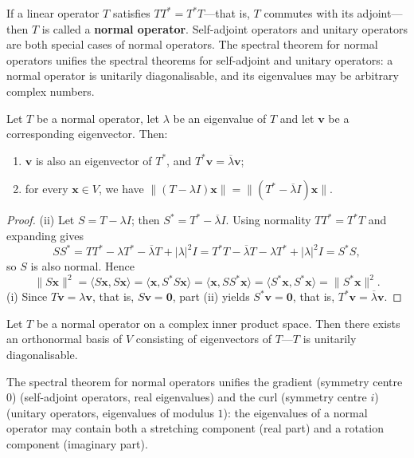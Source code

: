 \begin{definition}\label{def:normal_operator}
If a linear operator $T$ satisfies $T T^* = T^* T$---that is, $T$ commutes with its adjoint---then $T$ is called a \textbf{normal operator}. Self-adjoint operators and unitary operators are both special cases of normal operators. The spectral theorem for normal operators unifies the spectral theorems for self-adjoint and unitary operators: a normal operator is unitarily diagonalisable, and its eigenvalues may be arbitrary complex numbers.
\end{definition}

\begin{lemma}\label{ch5_lemma_normal_adjoint}
Let $T$ be a normal operator, let $\lambda$ be an eigenvalue of $T$ and let $\mathbf{v}$ be a corresponding eigenvector. Then:
\begin{enumerate}[label=(\roman*)]
    \item $\mathbf{v}$ is also an eigenvector of $T^*$, and $T^*\mathbf{v} = \overline{\lambda}\mathbf{v}$;
    \item for every $\mathbf{x} \in V$, we have $\|(T-\lambda I)\mathbf{x}\| = \|(T^*-\overline{\lambda}I)\mathbf{x}\|$.
\end{enumerate}
\end{lemma}

\begin{proof}
(ii) Let $S = T - \lambda I$; then $S^* = T^* - \overline{\lambda}I$. Using normality $TT^* = T^*T$ and expanding gives
\[
SS^* = TT^* - \lambda T^* - \overline{\lambda}T + |\lambda|^2 I = T^*T - \overline{\lambda}T - \lambda T^* + |\lambda|^2 I = S^*S,
\]
so $S$ is also normal. Hence
\[
\|S\mathbf{x}\|^2 = \langle S\mathbf{x}, S\mathbf{x}\rangle = \langle \mathbf{x}, S^*S\mathbf{x}\rangle = \langle \mathbf{x}, SS^*\mathbf{x}\rangle = \langle S^*\mathbf{x}, S^*\mathbf{x}\rangle = \|S^*\mathbf{x}\|^2.
\]
(i) Since $T\mathbf{v} = \lambda\mathbf{v}$, that is, $S\mathbf{v} = \mathbf{0}$, part (ii) yields $S^*\mathbf{v} = \mathbf{0}$, that is, $T^*\mathbf{v} = \overline{\lambda}\mathbf{v}$.
\end{proof}

\begin{theorem}\label{thm:spectral_theorem_normal}
Let $T$ be a normal operator on a complex inner product space. Then there exists an orthonormal basis of $V$ consisting of eigenvectors of $T$---$T$ is unitarily diagonalisable.

The spectral theorem for normal operators unifies the gradient (symmetry centre $0$) (self-adjoint operators, real eigenvalues) and the curl (symmetry centre $i$) (unitary operators, eigenvalues of modulus $1$): the eigenvalues of a normal operator may contain both a stretching component (real part) and a rotation component (imaginary part).
\end{theorem}


